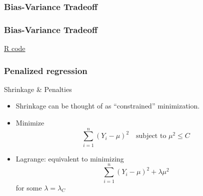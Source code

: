 \documentclass[handout]{beamer}
\begin{document}
   \begin{frame} \frametitle{Bias-Variance Tradeoff}

   \end{frame}



   \begin{frame}
   \frametitle{Bias-Variance Tradeoff}
   \begin{center}
   \end{center}
   \href{http://www.stanford.edu/class/stats191/selection.html#bias-variance-tradeoff}{R code}
   \end{frame}


   \begin{frame} \frametitle{Penalized regression}

   \begin{block}
     {Shrinkage \& Penalties}
     \begin{itemize}
     \item Shrinkage can be thought of as ``constrained'' minimization.

     \item Minimize
   $$
   \sum_{i=1}^n (Y_i - \mu)^2 \quad \text{subject to $\mu^2 \leq C$} $$

   \item Lagrange: equivalent to minimizing
   $$
   \sum_{i=1}^n (Y_i - \mu)^2 + \lambda \mu^2$$
   for some $\lambda=\lambda_C$
     \end{itemize}

   \end{block}
   \end{frame}
\end{document}
